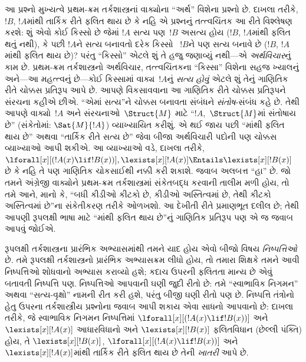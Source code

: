 આ પ્રશ્નો મુખ્યત્વે પ્રથમ-ક્રમ તર્કશાસ્ત્રનાં વાક્યોના
``અર્થ'' વિશેના પ્રશ્નો છે. દાખલા તરીકે, $!B$, $!A$માંથી તાર્કિક રીતે
ફલિત થાય છે કે નહિ એ પ્રશ્નનું તત્ત્વચિંતક આ રીતે વિશ્લેષણ કરશે: શું
એવો કોઈ કિસ્સો છે જેમાં $!A$ સત્ય પણ~$!B$ અસત્ય હોય ($!B$,
$!A$માંથી ફલિત થતું નથી), કે પછી $!A$ને સત્ય બનાવતો દરેક કિસ્સો
~$!B$ને પણ સત્ય બનાવે છે ($!B$, $!A$માંથી ફલિત થાય છે)? પરંતુ
``કિસ્સો'' એટલે શું તે હજુ જણાવ્યું નથી---એ \emph{અર્થવિચાર}નું કામ
છે. પ્રથમ-ક્રમ તર્કશાસ્ત્રનો અર્થવિચાર, તત્ત્વચિંતકના ``કિસ્સા'' વિશેના
સહજ ખ્યાલનું અને---આ મહત્ત્વનું છે---કોઈ કિસ્સામાં
વાક્ય~$!A$નું \emph{સત્ય હોવું} એટલે શું તેનું ગાણિતિક રીતે
ચોક્કસ પ્રતિરૂપ આપે છે. આપણે વિકસાવવાના આ ગાણિતિક રીતે ચોક્કસ
પ્રતિરૂપને સંરચના કહીએ છીએ. ``એમાં સત્ય''ને ચોક્કસ બનાવતા
સંબંધને \emph{સંતોષ}-સંબંધ કહે છે. તેથી આપણે વાક્યો~$!A$ અને
સંરચનાઓ~$\Struct{M}$ માટે ``$!A$,~$\Struct{M}$માં સંતોષાય છે''
(સંકેતોમાં: $\Sat{M}{!A}$) વ્યાખ્યાયિત કરીશું. એ થઈ જાય પછી ``માંથી
ફલિત થાય છે'' અથવા ``તાર્કિક રીતે સત્ય છે'' જેવા બીજા અર્થવિચારી
પદોની પણ ચોક્કસ વ્યાખ્યાઓ આપી શકીએ. આ વ્યાખ્યાઓ વડે, દાખલા તરીકે,
$\lforall[x][(!A(x) \lif !B(x))],
\lexists[x][!A(x)] \Entails \lexists[x][!B(x)]$ છે કે નહિ તે પણ
ગાણિતિક ચોકસાઈથી નક્કી કરી શકાશે. જવાબ અલબત્ત ``હા'' છે. જો તમને
અંગ્રેજી વાક્યોને પ્રથમ-ક્રમ તર્કશાસ્ત્રમાં સંકેતબદ્ધ કરવાની તાલીમ
મળી હોય, તો તમે આને, માનો કે, ``બધી કીડીઓ કીટકો છે, કીડીઓ અસ્તિત્વમાં
છે, તેથી કીટકો અસ્તિત્વમાં છે''ના સંકેતીકરણ તરીકે ઓળખશો. આ દેખીતી
રીતે પ્રમાણભૂત દલીલ છે; તેથી આપણી રૂપલક્ષી ભાષા માટે ``માંથી ફલિત થાય
છે''નું ગાણિતિક પ્રતિરૂપ પણ એ જ જવાબ આપવું જોઈએ.

રૂપલક્ષી તર્કશાસ્ત્રના પ્રારંભિક અભ્યાસમાંથી તમને યાદ હોય એવો બીજો
વિષય \emph{નિષ્પત્તિઓ} છે. તમે રૂપલક્ષી તર્કશાસ્ત્રનો પ્રારંભિક
અભ્યાસક્રમ લીધો હોય, તો તમારા શિક્ષકે તમને આવી નિષ્પત્તિઓ
શોધવાનો અભ્યાસ કરાવ્યો હશે; કદાચ ઉપરની ફલિતતા માન્ય છે એવું બતાવતી
નિષ્પત્તિ પણ. નિષ્પત્તિઓ આપવાની ઘણી જુદી રીતો છે: તમે
``સ્વાભાવિક નિગમન'' અથવા ``સત્ય-વૃક્ષો'' નામની રીત કરી હશે, પરંતુ
બીજી ઘણી રીતો પણ છે. નિષ્પત્તિ તંત્રોનો હેતુ ઉપરના
તર્કશાસ્ત્રીય પ્રશ્નોના જવાબ આપી શકાય એવા સાધનો આપવાનો છે: દાખલા
તરીકે, જે સ્વાભાવિક નિગમન નિષ્પત્તિમાં
$\lforall[x][(!A(x) \lif !B(x))]$ અને $\lexists[x][!A(x)]$ આધારવિધાનો
અને $\lexists[x][!B(x)]$ ફલિતવિધાન (છેલ્લી પંક્તિ) હોય, તે
$\lexists[x][!B(x)]$, $\lforall[x][(!A(x) \lif !B(x))]$ અને
$\lexists[x][!A(x)]$માંથી તાર્કિક રીતે ફલિત થાય છે તેની
\emph{ખાતરી} આપે છે.

